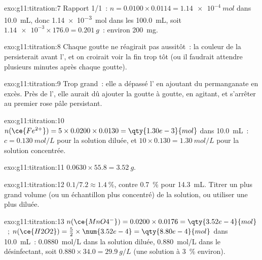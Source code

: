\begin{solution}{exo:g11:titration:7}
Rapport 1/1~: $n = 0.0100 \times 0.0114 = \qty{1.14e-4}{mol}$ dans
\qty{10.0}{mL}, donc \qty{1.14e-3}{mol} dans les \qty{100.0}{mL}, soit
$\num{1.14e-3} \times 176.0 = \qty{0.201}{g}$~: environ \qty{200}{mg}.
\end{solution}

\begin{solution}{exo:g11:titration:8}
Chaque goutte ne réagirait pas aussitôt~: la couleur de la  persisterait avant l', et on croirait voir la fin
trop tôt (ou il faudrait attendre plusieurs minutes après chaque
goutte).
\end{solution}

\begin{solution}{exo:g11:titration:9}
Trop grand~: elle a dépassé l' en ajoutant du permanganate en
excès. Près de l', elle aurait dû ajouter la  goutte à goutte, en agitant, et s'arrêter au premier rose pâle
persistant.
\end{solution}

\begin{solution}{exo:g11:titration:10}
$n(\ce{Fe^{2+}}) = 5 \times 0.0200 \times 0.0130 = \qty{1.30e-3}{mol}$
dans \qty{10.0}{mL}~: $c = \qty{0.130}{mol/L}$ pour la solution diluée,
et $10 \times 0.130 = \qty{1.30}{mol/L}$ pour la solution concentrée.
\end{solution}

\begin{solution}{exo:g11:titration:11}
$0.0630 \times 55.8 = \qty{3.52}{g}$.
\end{solution}

\begin{solution}{exo:g11:titration:12}
$0.1 / 7.2 \approx \qty{1.4}{\percent}$, contre \qty{0.7}{\percent} pour
\qty{14.3}{mL}. Titrer un plus grand volume (ou un échantillon plus
concentré) de la solution, ou utiliser une  plus
diluée.
\end{solution}

\begin{solution}{exo:g11:titration:13}
$n(\ce{MnO4^-}) = 0.0200 \times 0.0176 = \qty{3.52e-4}{mol}$~;
$n(\ce{H2O2}) = \frac{5}{2} \times \num{3.52e-4} = \qty{8.80e-4}{mol}$
dans \qty{10.0}{mL}~: \qty{0.0880}{mol/L} dans la solution diluée,
\qty{0.880}{mol/L} dans le désinfectant, soit
$0.880 \times 34.0 = \qty{29.9}{g/L}$ (une solution à 3~\% environ).
\end{solution}

